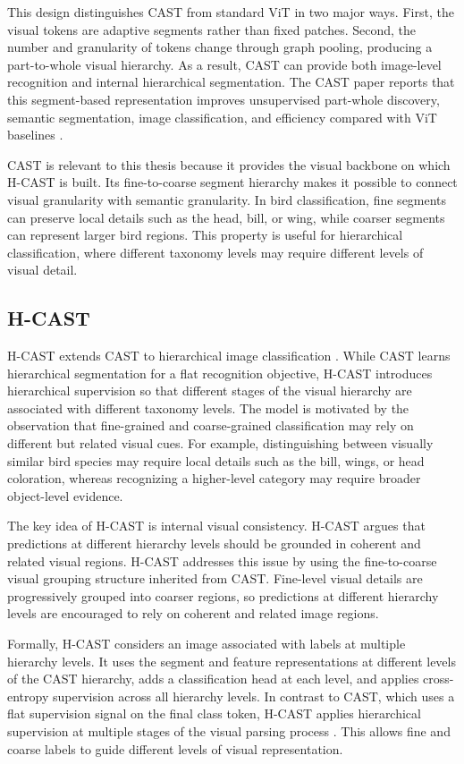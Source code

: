This design distinguishes CAST from standard ViT in two major ways. First, the visual tokens are adaptive segments rather than fixed patches. Second, the number and granularity of tokens change through graph pooling, producing a part-to-whole visual hierarchy. As a result, CAST can provide both image-level recognition and internal hierarchical segmentation. The CAST paper reports that this segment-based representation improves unsupervised part-whole discovery, semantic segmentation, image classification, and efficiency compared with ViT baselines \cite{ke2024learning}.

CAST is relevant to this thesis because it provides the visual backbone on which H-CAST is built. Its fine-to-coarse segment hierarchy makes it possible to connect visual granularity with semantic granularity. In bird classification, fine segments can preserve local details such as the head, bill, or wing, while coarser segments can represent larger bird regions. This property is useful for hierarchical classification, where different taxonomy levels may require different levels of visual detail.


\subsection{H-CAST}

H-CAST extends CAST to hierarchical image classification \cite{park2025visually}. While CAST learns hierarchical segmentation for a flat recognition objective, H-CAST introduces hierarchical supervision so that different stages of the visual hierarchy are associated with different taxonomy levels. The model is motivated by the observation that fine-grained and coarse-grained classification may rely on different but related visual cues. For example, distinguishing between visually similar bird species may require local details such as the bill, wings, or head coloration, whereas recognizing a higher-level category may require broader object-level evidence.

The key idea of H-CAST is internal visual consistency. H-CAST argues that predictions at different hierarchy levels should be grounded in coherent and related visual regions. H-CAST addresses this issue by using the fine-to-coarse visual grouping structure inherited from CAST. Fine-level visual details are progressively grouped into coarser regions, so predictions at different hierarchy levels are encouraged to rely on coherent and related image regions.

Formally, H-CAST considers an image associated with labels at multiple hierarchy levels. It uses the segment and feature representations at different levels of the CAST hierarchy, adds a classification head at each level, and applies cross-entropy supervision across all hierarchy levels. In contrast to CAST, which uses a flat supervision signal on the final class token, H-CAST applies hierarchical supervision at multiple stages of the visual parsing process \cite{park2025visually}. This allows fine and coarse labels to guide different levels of visual representation.

